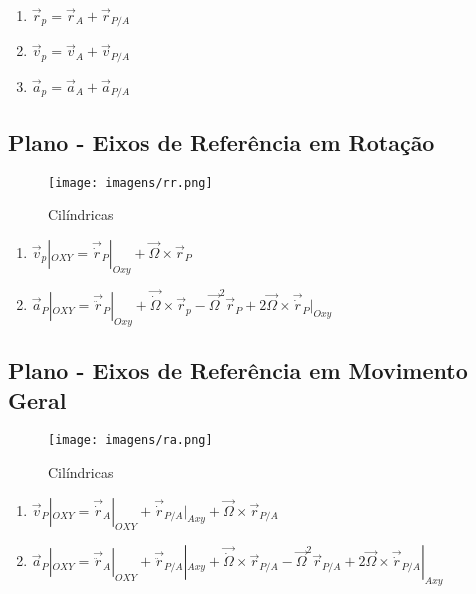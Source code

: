 \documentclass[a4paper, 12pt]{article}
\begin{document}
	\begin{enumerate}
		\item $\vec{r}_p = \vec{r}_A + \vec{r}_{P/A}$
		\item $\vec{v}_p = \vec{v}_A + \vec{v}_{P/A}$
		\item $\vec{a}_p = \vec{a}_A + \vec{a}_{P/A}$
	\end{enumerate}

	\subsection{Plano - Eixos de Referência em Rotação}
		\begin{figure}[h]
			\center
			\texttt{[image: imagens/rr.png]} 
			\caption{Cilíndricas}
		\end{figure}	

		\begin{enumerate}
			\item $\vec{v}_p|_{OXY} = \vec{\dot{r}}_P|_{Oxy} + \vec{\Omega}\times\vec{r}_P$
			\item $\vec{a}_P|_{OXY} = \vec{\ddot{r}}_P|_{Oxy} + \vec{\dot{\Omega}}\times \vec{r}_p - \vec{\Omega}^2\vec{r}_P + 2\vec{\Omega}\times \vec{\dot{r}}_P|_{Oxy}$
		\end{enumerate}
		
	\newpage
	\subsection{Plano - Eixos de Referência em Movimento Geral}
		\begin{figure}[h]
			\center
			\texttt{[image: imagens/ra.png]} 
			\caption{Cilíndricas}
		\end{figure}	

		\begin{enumerate}
			\item $\vec{v}_P|_{OXY} = \vec{\dot{r}}_A|_{OXY} + \vec{\dot{r}}_{P/A}|_{Axy} + \vec{\Omega} \times \vec{r}_{P/A}$
			\item $\vec{a}_P|_{OXY} = \vec{\ddot{r}}_A|_{OXY} + \vec{\ddot{r}}_{P/A}|_{Axy} + \vec{\dot{\Omega}}\times \vec{r}_{P/A} - \vec{\Omega}^2\vec{r}_{P/A} + 2\vec{\Omega}\times \vec{\dot{r}}_{P/A}|_{Axy}$
		\end{enumerate}
\end{document}

